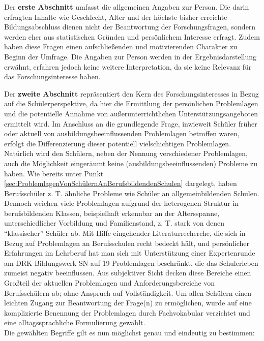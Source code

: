 Der \textbf{erste Abschnitt} umfasst die allgemeinen Angaben zur Person. Die darin erfragten Inhalte wie Geschlecht, Alter und der höchste bisher erreichte Bildungsabschluss dienen nicht der Beantwortung der Forschungsfragen, sondern werden eher aus statistischen Gründen und persönlichem Interesse erfragt. Zudem haben diese Fragen einen aufschließenden und motivierenden Charakter zu Beginn der Umfrage. Die Angaben zur Person werden in der Ergebnisdarstellung erwähnt, erfahren jedoch keine weitere Interpretation, da sie keine Relevanz für das Forschungsinteresse haben.

Der \textbf{zweite Abschnitt} repräsentiert den Kern des Forschungsinteresses in Bezug auf die Schülerperspektive, da hier die Ermittlung der persönlichen Problemlagen und die potentielle Annahme von außerunterrichtlichen Unterstützungsangeboten ermittelt wird. Im Anschluss an die grundlegende Frage, inwieweit Schüler früher oder aktuell von ausbildungsbeeinflussenden Problemlagen betroffen waren, erfolgt die Differenzierung dieser potentiell vielschichtigen Problemlagen. Natürlich wird den Schülern, neben der Nennung verschiedener Problemlagen, auch die Möglichkeit eingeräumt keine (ausbildungsbeeinflussenden) Probleme zu haben. Wie bereits unter Punkt \ref{sec:ProblemlagenVonSchülernAnBerufsbildendenSchulen} dargelegt, haben Berufsschüler z. T. ähnliche Probleme wie Schüler an allgemeinbildenden Schulen. Dennoch weichen viele Problemlagen aufgrund der heterogenen Struktur in berufsbildenden Klassen, beispielhaft erkennbar an der Altersspanne, unterschiedlicher Vorbildung und Familienstand, z. T. stark von denen "`klassischer"' Schüler ab. Mit Hilfe eingehender Literaturrecherche, die sich in Bezug auf Problemlagen an Berufsschulen recht bedeckt hält, und persönlicher Erfahrungen im Lehrberuf hat man sich mit Unterstützung einer Expertenrunde am DRK Bildungswerk SN auf 19 Problemlagen beschränkt, die das Schulerleben zumeist negativ beeinflussen. Aus subjektiver Sicht decken diese Bereiche einen Großteil der aktuellen Problemlagen und Anforderungsbereiche von Berufsschülern ab; ohne Anspruch auf  Vollständigkeit. Um allen Schülern einen leichten Zugang zur Beantwortung der Frage(n) zu ermöglichen, wurde auf eine komplizierte Benennung der Problemlagen durch Fachvokabular verzichtet und eine alltagssprachliche Formulierung gewählt.\\

\newpage
\noindent
Die gewählten Begriffe gilt es nun möglichst genau und eindeutig zu bestimmen:\\

